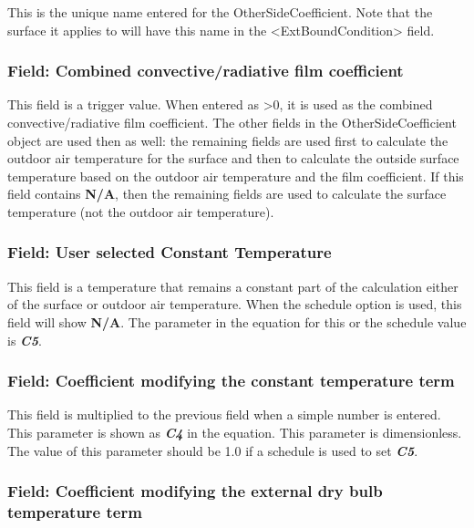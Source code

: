 This is the unique name entered for the OtherSideCoefficient. Note that the surface it applies to will have this name in the \textless{}ExtBoundCondition\textgreater{} field.

\subsubsection{Field: Combined convective/radiative film coefficient}\label{field-combined-convectiveradiative-film-coefficient}

This field is a trigger value. When entered as \textgreater{}0, it is used as the combined convective/radiative film coefficient. The other fields in the OtherSideCoefficient object are used then as well: the remaining fields are used first to calculate the outdoor air temperature for the surface and then to calculate the outside surface temperature based on the outdoor air temperature and the film coefficient. If this field contains \textbf{N/A}, then the remaining fields are used to calculate the surface temperature (not the outdoor air temperature).

\subsubsection{Field: User selected Constant Temperature}\label{field-user-selected-constant-temperature}

This field is a temperature that remains a constant part of the calculation either of the surface or outdoor air temperature. When the schedule option is used, this field will show \textbf{N/A}. The parameter in the equation for this or the schedule value is \textbf{\emph{C5}}.

\subsubsection{Field: Coefficient modifying the constant temperature term}\label{field-coefficient-modifying-the-constant-temperature-term}

This field is multiplied to the previous field when a simple number is entered. This parameter is shown as \textbf{\emph{C4}} in the equation. This parameter is dimensionless. The value of this parameter should be 1.0 if a schedule is used to set \textbf{\emph{C5}}.

\subsubsection{Field: Coefficient modifying the external dry bulb temperature term}\label{field-coefficient-modifying-the-external-dry-bulb-temperature-term}

